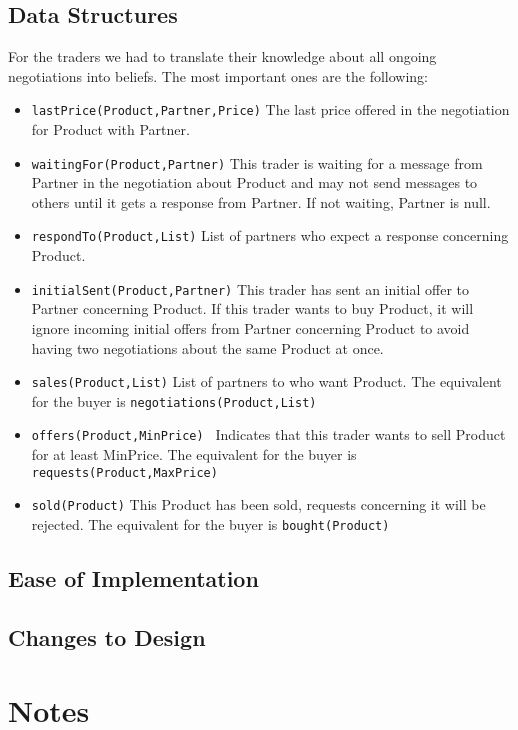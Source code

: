 \documentclass[a4paper,11pt]{article}
\begin{document}
\subsection{Data Structures}
For the traders we had to translate their knowledge about all ongoing negotiations into beliefs. The most important ones are the following:
\begin{itemize}
  \item \texttt{lastPrice(Product,Partner,Price)} The last price offered in the negotiation for
Product with Partner.
  \item \texttt{waitingFor(Product,Partner)} This trader is waiting for a message from Partner 
in the negotiation about Product and may not send messages to others until it
gets a response from Partner. If not waiting, Partner is null.
 \item \texttt{respondTo(Product,List)} List of partners who expect a response concerning 
Product.
\item \texttt{initialSent(Product,Partner)} This trader has sent an initial offer to Partner
concerning Product. If this trader wants to buy Product, it will ignore incoming 
initial offers from Partner concerning Product to avoid having two negotiations 
about the same Product at once.
\item \texttt{sales(Product,List)} List of partners to who want Product. The equivalent for the buyer is \texttt{negotiations(Product,List)}
\item \texttt{offers(Product,MinPrice) } Indicates that this trader wants to sell Product for
at least MinPrice. The equivalent for the buyer is \texttt{requests(Product,MaxPrice)}
\item \texttt{sold(Product)} This Product has been sold, requests concerning it will be
rejected. The equivalent for the buyer is \texttt{bought(Product)}
\end{itemize}



\subsection{Ease of Implementation}


\subsection{Changes to Design}


\section{Notes}
\end{document}
